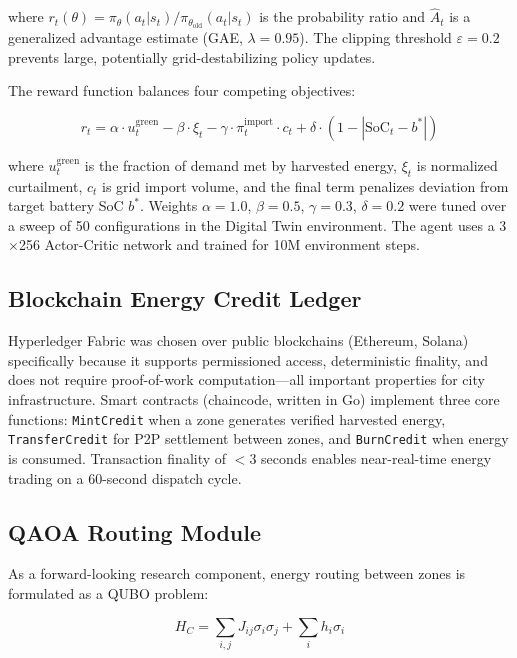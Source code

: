 \documentclass[conference]{IEEEtran}
\begin{document}
where $r_t(\theta) = \pi_\theta(a_t|s_t) / \pi_{\theta_{\text{old}}}(a_t|s_t)$ is the probability ratio and $\hat{A}_t$ is a generalized advantage estimate (GAE, $\lambda=0.95$). The clipping threshold $\varepsilon = 0.2$ prevents large, potentially grid-destabilizing policy updates.

The reward function balances four competing objectives:

\begin{equation}
r_t = \alpha \cdot u_t^{\text{green}} - \beta \cdot \xi_t - \gamma \cdot \pi_t^{\text{import}} \cdot c_t + \delta \cdot (1 - |\text{SoC}_t - b^*|)
\label{eq:reward}
\end{equation}

where $u_t^{\text{green}}$ is the fraction of demand met by harvested energy, $\xi_t$ is normalized curtailment, $c_t$ is grid import volume, and the final term penalizes deviation from target battery SoC $b^*$. Weights $\alpha=1.0$, $\beta=0.5$, $\gamma=0.3$, $\delta=0.2$ were tuned over a sweep of 50 configurations in the Digital Twin environment. The agent uses a 3$\times$256 Actor-Critic network and trained for 10M environment steps.

\subsection{Blockchain Energy Credit Ledger}

Hyperledger Fabric was chosen over public blockchains (Ethereum, Solana) specifically because it supports permissioned access, deterministic finality, and does not require proof-of-work computation—all important properties for city infrastructure. Smart contracts (chaincode, written in Go) implement three core functions: \texttt{MintCredit} when a zone generates verified harvested energy, \texttt{TransferCredit} for P2P settlement between zones, and \texttt{BurnCredit} when energy is consumed. Transaction finality of $<$3 seconds enables near-real-time energy trading on a 60-second dispatch cycle.

\subsection{QAOA Routing Module}

As a forward-looking research component, energy routing between zones is formulated as a QUBO problem:

\begin{equation}
H_C = \sum_{i,j} J_{ij} \sigma_i \sigma_j + \sum_i h_i \sigma_i
\label{eq:qubo}
\end{equation}
\end{document}
